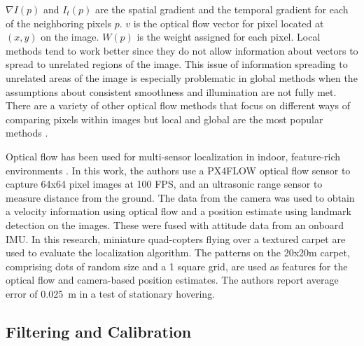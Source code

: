 \documentclass{article}
\begin{document}
    $\nabla I(p)$ and $I_t(p)$ are the spatial gradient and the temporal gradient for each of the neighboring pixels $p$. $v$ is the optical flow vector for pixel located at $(x, y)$ on the image. $W(p)$ is the weight assigned for each pixel. Local methods tend to work better since they do not allow information about vectors to spread to unrelated regions of the image. This issue of information spreading to unrelated areas of the image is especially problematic in global methods when the assumptions about consistent smoothness and illumination are not fully met. There are a variety of other optical flow methods that focus on different ways of comparing pixels within images but local and global are the most popular methods \cite{odonovan_optical_2005}.

    Optical flow has been used for multi-sensor localization in indoor, feature-rich environments \cite{gao_qingji_onboard_2015}. In this work, the authors use a PX4FLOW optical flow sensor to capture 64x64 pixel images at 100 FPS, and an ultrasonic range sensor to measure distance from the ground. The data from the camera was used to obtain a velocity information using optical flow and a position estimate using landmark detection on the images. These were fused with attitude data from an onboard IMU. In this research, miniature quad-copters flying over a textured carpet are used to evaluate the localization algorithm. The patterns on the 20x20m carpet, comprising dots of random size and a 1 square grid, are used as features for the optical flow and camera-based position estimates. The authors report average error of \SI{0.025}{\meter} in a test of stationary hovering.

  \subsection{Filtering and Calibration} \label{filtering}
\end{document}
